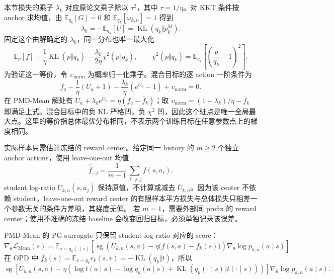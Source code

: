 本节损失的乘子 $\lambda_k$ 对应原论文乘子除以 $\tau^2$，其中 $\tau=1/\eta$。对 KKT 条件按 anchor 求均值，由 $\mathbb E_{ q_k}[G]=0$ 和 $\mathbb E_{ q_k}[\omega_{k,n}]=1$ 得到
\begin{equation*}
\lambda_k=-\mathbb E_{ q_k}[U]
=\operatorname{KL}( q_k\Vert p_k^{\mathrm M}).
\end{equation*}
固定这个由解确定的 $\lambda_k$，同一分布也唯一最大化
\begin{equation}
\mathbb E_p[f]-\frac1\eta\operatorname{KL}(p\Vert q_k)
-\frac{\lambda_k}{2\eta}\chi^2(p\Vert q_k),
\qquad
\chi^2(p\Vert q_k)=\mathbb E_{ q_k}\left[\left(\frac p{ q_k}-1\right)^2\right].
\label{eq:ch2-mean-mixed-objective}
\end{equation}
为验证这一等价，令 $\upsilon_{\mathrm{norm}}$ 为概率归一化乘子。混合目标的逐 action 一阶条件为
\begin{equation*}
f_a-\frac1\eta(U_a+1)-\frac{\lambda_k}{\eta}(e^{U_a}-1)+\upsilon_{\mathrm{norm}}=0.
\end{equation*}
在 PMD-Mean 解处有 $U_a+\lambda_k e^{U_a}=\eta(f_a-\bar f_k)$；取
$\upsilon_{\mathrm{norm}}=(1-\lambda_k)/\eta-\bar f_k$ 即满足上式。混合目标中的负 KL 严格凹，负 $\chi^2$ 凹，因此这个驻点是唯一全局最大点。这里的等价指总体最优分布相同，不表示两个训练目标在任意参数点上的梯度相同。

实际样本只需估计冻结的 reward center。给定同一 history 的 $m\ge2$ 个独立 anchor actions，使用 leave-one-out 均值
\begin{equation*}
\widehat{\bar f}_{-j}=\frac1{m-1}\sum_{\ell\ne j}f(s,a_\ell).
\end{equation*}
student log-ratio $U_{k,n}(s,a_j)$ 保持原值，不计算或减去 $\bar U_{k,n}$。因为该 center 不依赖 student，leave-one-out reward center 的有限样本平方损失与总体损失只相差一个参数无关的条件方差项，其梯度无偏。
若 $m=1$，需要外部同 prefix 的 reward center；使用不准确的冻结 baseline 会改变回归目标，必须单独记录该误差。

PMD-Mean 的 PG surrogate 只保留 student log-ratio 对应的 score：
\begin{equation}
\label{eq:ch2-mean-pg}
\nabla_\theta\mathcal L_{\mathrm{Mean}}(s)
=\mathbb E_{a\sim q_k(\cdot\mid s)}\left[
\operatorname{sg}\!\left(U_{k,n}(s,a)-\eta\bigl(f(s,a)-\bar f_k(s)\bigr)\right)
\nabla_\theta\log p_{k,n}(a\mid s)\right].
\end{equation}
在 OPD 中 $\bar f_k(s)=\mathbb E_{v\sim q_k}r_k(s,v)=-\operatorname{KL}( q_k\Vert t)$，所以
\begin{equation}
\label{eq:ch2-mean-opd-pg}
\operatorname{sg}\!\left[
U_{k,n}(s,a)-\eta\left(\log t(a\mid s)-\log q_k(a\mid s)
+\operatorname{KL}( q_k(\cdot\mid s)\Vert t(\cdot\mid s))\right)
\right]\nabla_\theta\log p_{k,n}(a\mid s).
\end{equation}

